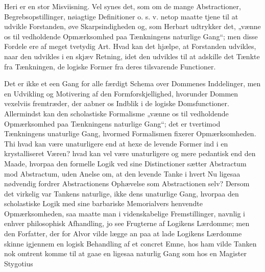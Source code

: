 \documentclass[12pt]{book}
\newcommand{\opage}[1]{\marginnote{\footnotesize\textit{[#1]}}}
\begin{document}
Heri er en stor Misviisning. Vel synes det, som om
de mange Abstractioner, Begrebsopstillinger, nøiagtige Definitioner
o. s. v. netop maatte tjene til at udvikle Forstanden,
øve Skarpsindigheden og, som Herbart udtrykker det, „vænne
os til vedholdende Opmærksomhed paa Tænkningens naturlige
Gang“; men disse Fordele ere af meget tvetydig Art. Hvad
kan det hjælpe, at Forstanden udvikles, naar den udvikles i en
\opage{67}skjæv Retning, idet den udvikles til at adskille det Tænkte fra
Tænkningen, de logiske Former fra deres tilsvarende Functioner.

Det er ikke et een Gang for alle færdigt Schema over
Dommenes Inddelinger, men en Udvikling og Motivering af
den Formforskjellighed, hvorunder Dommen vexelviis fremtræder,
der aabner os Indblik i de logiske Domsfunctioner.
Allermindst kan den scholastiske Formalisme „vænne
os til vedholdende Opmærksomhed paa Tænkningens naturlige
Gang“; det er tvertimod Tænkningens unaturlige Gang, hvormed
Formalismen fixerer Opmærksomheden. Thi hvad kan være
unaturligere end at hexe de levende Former ind i en krystalliseret
Væren? hvad kan vel være unaturligere og mere pedantisk
end den Maade, hvorpaa den formelle Logik ved sine Distinctioner
sætter Abstractum mod Abstractum, uden Anelse om, at
den levende Tanke i hvert Nu ligesaa nødvendig fordrer Abstractionens
Ophævelse som Abstractionen selv? Dersom det
virkelig var Tankens naturlige, ikke dens unaturlige Gang,
hvorpaa den scholastiske Logik med sine barbariske Memorialvers
henvendte Opmærksomheden, saa maatte man i videnskabelige
Fremstillinger, navnlig i enhver philosophisk Afhandling,
jo see Frugterne af Logikens Lærdomme; men den Forfatter,
der for Alvor vilde lægge an paa at lade Logikens
Lærdomme skinne igjennem en logisk Behandling af et concret
Emne, hos ham vilde Tanken nok omtrent komme til
at gaae en ligesaa naturlig Gang som hos en Magister Stygotius
\end{document}
